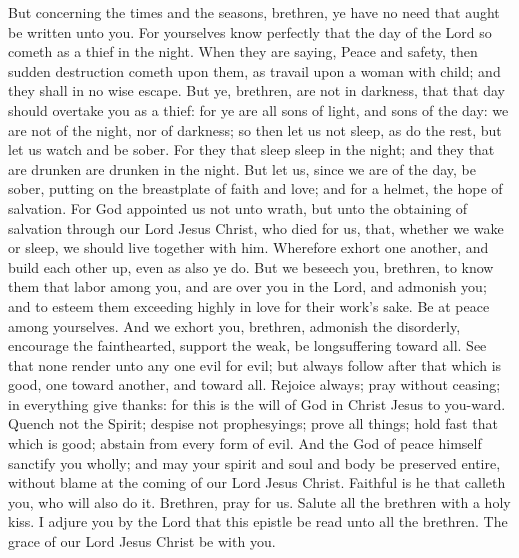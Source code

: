 But concerning the times and the seasons, brethren, ye have no need that aught be written unto you. For yourselves know perfectly that the day of the Lord so cometh as a thief in the night. When they are saying, Peace and safety, then sudden destruction cometh upon them, as travail upon a woman with child; and they shall in no wise escape. But ye, brethren, are not in darkness, that that day should overtake you as a thief: for ye are all sons of light, and sons of the day: we are not of the night, nor of darkness; so then let us not sleep, as do the rest, but let us watch and be sober. For they that sleep sleep in the night; and they that are drunken are drunken in the night. But let us, since we are of the day, be sober, putting on the breastplate of faith and love; and for a helmet, the hope of salvation. For God appointed us not unto wrath, but unto the obtaining of salvation through our Lord Jesus Christ, who died for us, that, whether we wake or sleep, we should live together with him. Wherefore exhort one another, and build each other up, even as also ye do.  But we beseech you, brethren, to know them that labor among you, and are over you in the Lord, and admonish you; and to esteem them exceeding highly in love for their work’s sake. Be at peace among yourselves. And we exhort you, brethren, admonish the disorderly, encourage the fainthearted, support the weak, be longsuffering toward all. See that none render unto any one evil for evil; but always follow after that which is good, one toward another, and toward all. Rejoice always; pray without ceasing; in everything give thanks: for this is the will of God in Christ Jesus to you-ward. Quench not the Spirit; despise not prophesyings; prove all things; hold fast that which is good; abstain from every form of evil.  And the God of peace himself sanctify you wholly; and may your spirit and soul and body be preserved entire, without blame at the coming of our Lord Jesus Christ. Faithful is he that calleth you, who will also do it.  Brethren, pray for us.  Salute all the brethren with a holy kiss. I adjure you by the Lord that this epistle be read unto all the brethren.  The grace of our Lord Jesus Christ be with you. 